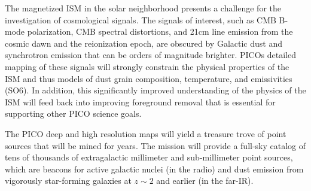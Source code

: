 \documentclass[PICOReport.tex]{subfiles}
\begin{document}
The magnetized ISM in the solar neighborhood presents a challenge for the investigation of cosmological signals. The signals of interest, such as CMB B-mode polarization, CMB spectral distortions, and 21cm line emission from the cosmic dawn and the reionization epoch, are obscured by Galactic dust and synchrotron emission that can be orders of magnitude brighter. PICOs detailed mapping of these signals will strongly constrain the physical properties of the ISM and thus models of dust grain composition, temperature, and emissivities (SO6). In addition, this significantly improved understanding of the physics of the ISM will feed back into improving foreground removal that is essential for supporting other PICO science goals.

The PICO deep and high resolution maps will yield a treasure trove of point sources that will be mined for years. The mission will provide a full-sky catalog of tens of thousands of extragalactic millimeter and sub-millimeter point sources, which are beacons for active galactic nuclei (in the radio) and dust emission from vigorously star-forming galaxies at $z \sim 2$ and earlier (in the far-IR). 


\end{document}
